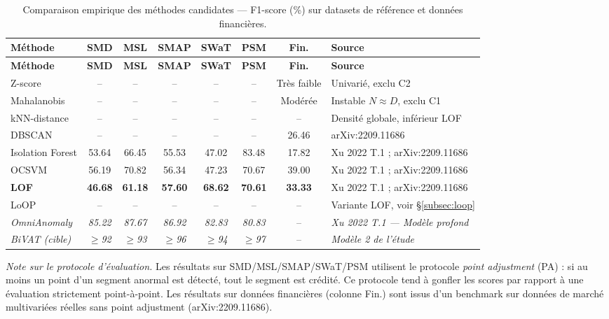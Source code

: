 \documentclass[12pt,a4paper]{article}
\newcommand{\nd}{--}
\begin{document}
\begin{longtable}{p{3.5cm}ccccccp{2.5cm}}
\caption{Comparaison empirique des méthodes candidates --- F1-score (\%) sur
datasets de référence et données financières.}
\label{tab:selection}\\
\toprule
\textbf{Méthode} & \textbf{SMD} & \textbf{MSL} & \textbf{SMAP} &
\textbf{SWaT} & \textbf{PSM} & \textbf{Fin.} & \textbf{Source} \\
\midrule
\endfirsthead
\toprule
\textbf{Méthode} & \textbf{SMD} & \textbf{MSL} & \textbf{SMAP} &
\textbf{SWaT} & \textbf{PSM} & \textbf{Fin.} & \textbf{Source} \\
\midrule
\endhead
\bottomrule\endlastfoot

Z-score & \nd & \nd & \nd & \nd & \nd & Très faible &
Univarié, exclu C2 \\
\midrule
Mahalanobis & \nd & \nd & \nd & \nd & \nd & Modérée &
Instable $N \approx D$, exclu C1 \\
\midrule
kNN-distance & \nd & \nd & \nd & \nd & \nd & \nd &
Densité globale, inférieur LOF \\
\midrule
DBSCAN & \nd & \nd & \nd & \nd & \nd & 26.46 &
arXiv:2209.11686 \\
\midrule
Isolation Forest & 53.64 & 66.45 & 55.53 & 47.02 & 83.48 & 17.82 &
Xu 2022 T.1 ; arXiv:2209.11686 \\
\midrule
OCSVM & 56.19 & 70.82 & 56.34 & 47.23 & 70.67 & 39.00 &
Xu 2022 T.1 ; arXiv:2209.11686 \\
\midrule
\textbf{LOF} & \textbf{46.68} & \textbf{61.18} & \textbf{57.60} &
\textbf{68.62} & \textbf{70.61} & \textbf{33.33} &
Xu 2022 T.1 ; arXiv:2209.11686 \\
\midrule
LoOP & \nd & \nd & \nd & \nd & \nd & \nd &
Variante LOF, voir \S\ref{subsec:loop} \\
\midrule
\textit{OmniAnomaly} & \textit{85.22} & \textit{87.67} & \textit{86.92} &
\textit{82.83} & \textit{80.83} & \nd &
\textit{Xu 2022 T.1 --- Modèle profond} \\
\midrule
\textit{BiVAT (cible)} & \textit{$\geq$92} & \textit{$\geq$93} &
\textit{$\geq$96} & \textit{$\geq$94} & \textit{$\geq$97} & \nd &
\textit{Modèle 2 de l'étude} \\
\end{longtable}

\textit{Note sur le protocole d'évaluation.} Les résultats sur SMD/MSL/SMAP/SWaT/PSM
utilisent le protocole \textit{point adjustment} (PA) : si au moins un point
d'un segment anormal est détecté, tout le segment est crédité. Ce protocole
tend à gonfler les scores par rapport à une évaluation strictement
point-à-point. Les résultats sur données financières (colonne Fin.) sont issus
d'un benchmark sur données de marché multivariées réelles sans point adjustment
(arXiv:2209.11686).
\end{document}
